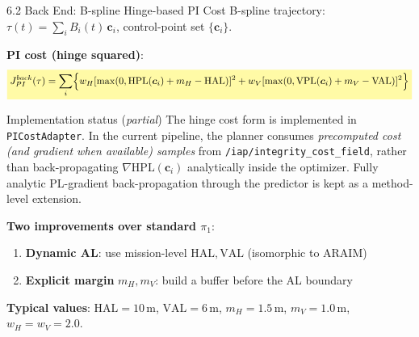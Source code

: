 \documentclass[10pt,aspectratio=169,xcolor=dvipsnames]{beamer}
\newcommand{\HPL}{\mathrm{HPL}}
\newcommand{\VPL}{\mathrm{VPL}}
\newcommand{\HAL}{\mathrm{HAL}}
\newcommand{\VAL}{\mathrm{VAL}}
\newcommand{\1}{\mathbb{1}}
\newcommand{\hlb}[1]{\colorbox{yellow!35}{\(\displaystyle #1\)}}
\newcommand{\innov}[1]{\textcolor{NavyBlue}{\textbf{#1}}}
\begin{document}
\begin{frame}{6.2 Back End: B-spline Hinge-based PI Cost}
  \small
  B-spline trajectory: $\tau(t)=\sum_i B_i(t)\,\bm{c}_i$, control-point set $\{\bm{c}_i\}$.

  \medskip
  \textbf{PI cost (hinge squared)}:
  \[
    \hlb{
      J_{PI}^{back}(\tau)=\sum_i\Bigl\{w_H[\max(0,\HPL(\bm{c}_i)+m_H-\HAL)]^2+w_V[\max(0,\VPL(\bm{c}_i)+m_V-\VAL)]^2\Bigr\}
    }
  \]

  \medskip
  \begin{alertblock}{\small Implementation status (\emph{partial})}
    \scriptsize
    The hinge cost form is implemented in \texttt{PICostAdapter}. In the current pipeline, the planner consumes \emph{precomputed cost (and gradient when available) samples} from \texttt{/iap/integrity\_cost\_field}, rather than back-propagating $\nabla\HPL(\bm{c}_i)$ analytically inside the optimizer. Fully analytic PL-gradient back-propagation through the predictor is kept as a method-level extension.
  \end{alertblock}

  \medskip
  \textbf{Two improvements over standard $\pi_1$}:
  \begin{enumerate}\scriptsize
    \item \innov{Dynamic AL}: use mission-level $\HAL,\VAL$ (isomorphic to ARAIM)
    \item \innov{Explicit margin} $m_H,m_V$: build a buffer before the AL boundary
  \end{enumerate}

  \textbf{Typical values}: $\HAL=10\,\si{\meter}$, $\VAL=6\,\si{\meter}$, $m_H=1.5\,\si{\meter}$, $m_V=1.0\,\si{\meter}$, $w_H=w_V=2.0$.
\end{frame}
\end{document}
